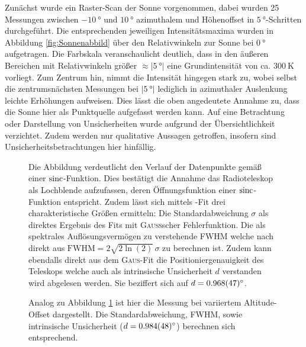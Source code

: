     Zunächst wurde ein Raster-Scan der Sonne vorgenommen, dabei wurden 25 Messungen zwischen $\SI{-10}{\degree}$ und $\SI{10}{\degree}$ azimuthalem und Höhenoffset in $\SI{5}{\degree}$-Schritten durchgeführt.
    Die entsprechenden jeweiligen Intensitätsmaxima wurden in Abbildung \ref{fig:Sonnenabbild} über den Relativwinkeln zur Sonne bei $\SI{0}{\degree}$ aufgetragen.
    Die Farbskala veranschaulicht deutlich, dass in den äußeren Bereichen mit Relativwinkeln größer $\approx \vert \SI{5}{\degree}\vert$ eine Grundintensität von ca. $\SI{300}{\kelvin}$ vorliegt.
    Zum Zentrum hin, nimmt die Intensität hingegen stark zu,
    wobei selbst die zentrumsnächsten Messungen bei $\vert\SI{5}{\degree}\vert$ lediglich in azimuthaler Auslenkung leichte Erhöhungen aufweisen.
    Dies lässt die oben angedeutete Annahme zu, dass die Sonne hier als Punktquelle aufgefasst werden kann.
    Auf eine Betrachtung oder Darstellung von Unsicherheiten wurde aufgrund der Übersichtlichkeit verzichtet. Zudem werden nur qualitative Aussagen getroffen, insofern sind Unsicherheitsbetrachtungen hier hinfällig.


    \begin{figure}[H]
        \centering
        
        \caption[Kreuz-Scan der Sonne, Azimuthaler Offset]{Die Abbildung verdeutlicht den Verlauf der Datenpunkte gemäß einer $\operatorname{sinc}$-Funktion. Dies bestätigt die Annahme das Radioteleskop als Lochblende aufzufassen, deren Öffnungsfunktion einer $\operatorname{sinc}$-Funktion entspricht. Zudem lässt sich mittels -Fit drei charakteristische Größen ermitteln: Die Standardabweichung $\sigma$ als direktes Ergebnis des Fits mit \textsc{Gauß}scher Fehlerfunktion. Die als spektrales Auflösungsvermögen zu verstehende FWHM welche nach \cite{wiki:FWHM} direkt aus $\text{FWHM} = 2\sqrt{2\ln(2)} \, \sigma$ zu berechnen ist. Zudem kann ebendalls direkt aus dem \textsc{Gaus}-Fit die Positioniergenauigkeit des Teleskops welche auch als intrinsische Unsicherheit $d$ verstanden wird abgelesen werden. Sie beziffert sich auf $d = \SI{0.968 \pm 0.047}{\degree}$.}
        \label{fig:Sonnenkreuz_Az}
    \end{figure}

    \begin{figure}[H]
        \centering
        
        \caption[Kreuz-Scan der Sonne, Altitude Offset]{Analog zu Abbildung \ref{fig:Sonnenkreuz_Az} ist hier die Messung bei variiertem Altitude-Offset dargestellt. Die Standardabweichung, FWHM, sowie intrinsische Unsicherheit ($d = \SI{0.984 \pm 0.048}{\degree}$) berechnen sich entsprechend.}
        \label{fig:Sonnenkreuz_Alt}
    \end{figure}

